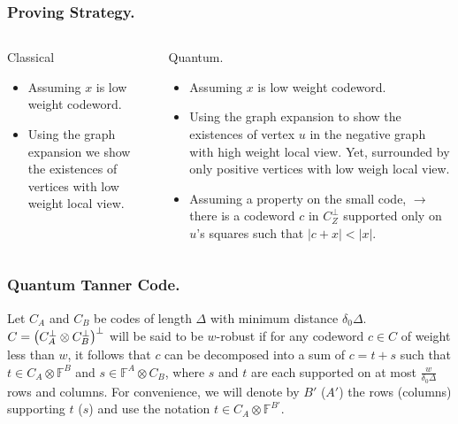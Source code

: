 \documentclass[usenames, aspectratio=169]{beamer}
\theoremstyle{claim}
\theoremstyle{remark}
\begin{document}
\begin{frame}
  \frametitle{ Proving Strategy. }
  \begin{columns}[t]
\begin{column}{0.5\textwidth}

  \begin{block}{Classical}
    \begin{itemize}%
      \item Assuming $x$ is low weight codeword. 
      \item Using the graph expansion we show the existences of vertices with low weight local view.  
    \end{itemize}
\end{block}

\end{column}
    \begin{column}{0.5\textwidth}
      \begin{block}{Quantum.}
        \begin{itemize}[<+->]
        \item Assuming $x$ is low weight codeword. 
        \item  Using the graph expansion to show the existences of vertex $u$ in the negative graph with high weight local view. Yet, surrounded by only positive vertices with low weigh local view. 
        \item Assuming a property on the small code, $\rightarrow$ there is a codeword $c$ in $C_{Z}^{\perp}$ supported only on $u$'s squares such that $|c + x| < |x|$. 
      \end{itemize} 
    \end{block}
\end{column}
\end{columns}

\end{frame}

\begin{frame}
  \frametitle{Quantum Tanner Code.}
\begin{definition}[$w$-Robustness] 
  \label{def:wrobust}
  Let $C_{A}$ and $C_{B}$ be codes of length $\Delta$ with minimum distance $\delta_{0}\Delta$. $C = \left( C_{A}^{\perp}\otimes C_{B}^{\perp} \right)^{\perp} $ will be said to be $w$-robust if for any codeword $c \in C$ of weight less than $w$, it follows that $c$ can be decomposed into a sum of $c = t + s$ such that $t \in C_A \otimes \mathbb{F}^{B}$ and $s \in \mathbb{F}^A \otimes C_B$, where $s$ and $t$ are each supported on at most $\frac{w}{\delta_0\Delta}$ rows and columns. For convenience, we will denote by $B'$ ($A'$) the rows (columns) supporting $t$ ($s$) and use the notation $t \in C_A \otimes \mathbb{F}^{B'}$.
\end{definition}

\end{frame}
\end{document}
